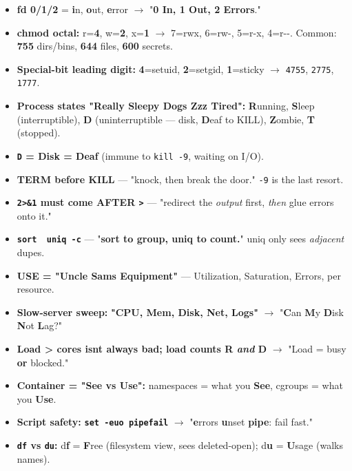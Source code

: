 \documentclass[11pt]{article}
\providecommand{\tightlist}{\setlength{\itemsep}{1pt}\setlength{\parskip}{0pt}}
\begin{document}
\begin{itemize}
\tightlist
\item
  \textbf{fd 0/1/2} = \textbf{i}n, \textbf{o}ut, \textbf{e}rror \(\rightarrow\) "\textbf{0 In, 1 Out, 2 Errors}."
\item
  \textbf{chmod octal:} r=\textbf{4}, w=\textbf{2}, x=\textbf{1} \(\rightarrow\) 7=rwx, 6=rw-, 5=r-x, 4=r-\/-. Common: \textbf{755} dirs/bins, \textbf{644} files, \textbf{600} secrets.
\item
  \textbf{Special-bit leading digit:} \textbf{4}=setuid, \textbf{2}=setgid, \textbf{1}=sticky \(\rightarrow\) \texttt{4755}, \texttt{2775}, \texttt{1777}.
\item
  \textbf{Process states "Really Sleepy Dogs Zzz Tired":} \textbf{R}unning, \textbf{S}leep (interruptible), \textbf{D} (uninterruptible --- disk, \textbf{D}eaf to KILL), \textbf{Z}ombie, \textbf{T} (stopped).
\item
  \textbf{\texttt{D} = Disk = Deaf} (immune to \texttt{kill\ -9}, waiting on I/O).
\item
  \textbf{TERM before KILL} --- "knock, then break the door." \texttt{-9} is the last resort.
\item
  \textbf{\texttt{2\textgreater{}\&1} must come AFTER \texttt{\textgreater{}}} --- "redirect the \emph{output} first, \emph{then} glue errors onto it."
\item
  \textbf{\texttt{sort\ \textbar{}\ uniq\ -c}} --- "\textbf{sort to group, uniq to count.}" uniq only sees \emph{adjacent} dupes.
\item
  \textbf{USE = "Uncle Sam\textquotesingle s Equipment"} --- Utilization, Saturation, Errors, per resource.
\item
  \textbf{Slow-server sweep:} \textbf{"CPU, Mem, Disk, Net, Logs"} \(\rightarrow\) "\textbf{C}an \textbf{M}y \textbf{D}isk \textbf{N}ot \textbf{L}ag?"
\item
  \textbf{Load \textgreater{} cores isn\textquotesingle t always bad; load counts R \emph{and} D} \(\rightarrow\) "Load = busy \textbf{or} blocked."
\item
  \textbf{Container = "See vs Use":} namespaces = what you \textbf{See}, cgroups = what you \textbf{Use}.
\item
  \textbf{Script safety:} \textbf{\texttt{set\ -euo\ pipefail}} \(\rightarrow\) "\textbf{e}rrors \textbf{u}nset \textbf{pipe}: fail fast."
\item
  \textbf{\texttt{df} vs \texttt{du}:} d\textbf{f} = \textbf{F}ree (filesystem view, sees deleted-open); d\textbf{u} = \textbf{U}sage (walks names).
\end{itemize}
\end{document}
